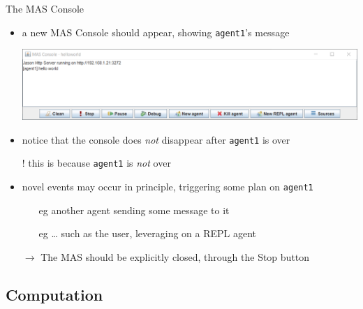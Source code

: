 \documentclass[presentation]{beamer}\mode<presentation>{\usetheme{AMSBolognaFC}}
\begin{document}
\begin{frame}[c]{The MAS Console}

    \begin{itemize}
        \item a new \alert{MAS Console} should appear, showing \texttt{agent1}'s message
        \begin{center}
            \includegraphics[width=\linewidth]{figures/mas-console.png}
        \end{center}
        
        \vfill
        
        \item notice that the console does \emph{not} disappear after \texttt{agent1} is over 
        
        \vfill
        
        \item[!] this is because \texttt{agent1} is \emph{not} over
    
        \vfill
        
        \item novel events may occur in principle, triggering some plan on \texttt{agent1}
        \begin{itemize}
             \item[eg] another agent sending some message to it
             \item[eg] \ldots{} such as the user, leveraging on a REPL agent
        \end{itemize}
        
        \vfill
        
        \item[$\rightarrow$] The MAS should be explicitly closed, through the \alert{Stop} button
    \end{itemize}
\end{frame} 

\subsection{Computation}
\end{document}
